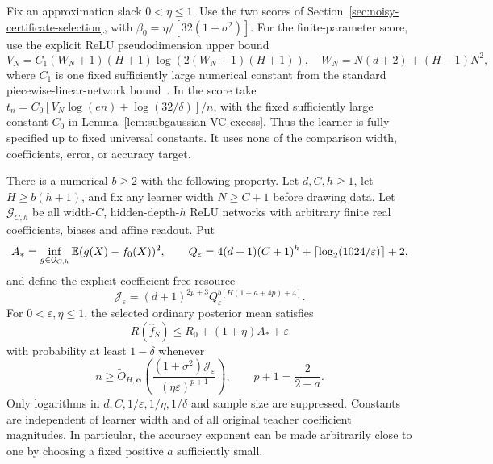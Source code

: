 Fix an approximation slack $0<\eta\le1$. Use the two scores of Section~\ref{sec:noisy-certificate-selection}, with
$\beta_0=\eta/[32(1+\sigma^2)]$. For the finite-parameter score, use the explicit ReLU pseudodimension upper bound
\[
 V_N=C_1(W_N+1)(H+1)\log(2(W_N+1)(H+1)),
 \quad W_N=N(d+2)+(H-1)N^2,
\]
where $C_1$ is one fixed sufficiently large numerical constant from the standard piecewise-linear-network bound~\cite{relu-vc}. In the score take
$t_n=C_0[V_N\log(en)+\log(32/\delta)]/n$, with the fixed sufficiently large constant $C_0$ in Lemma~\ref{lem:subgaussian-VC-excess}. Thus the learner is fully specified up to fixed universal constants. It uses none of the comparison width, coefficients, error, or accuracy target.

\begin{theorem}
\label{thm:layerwise-Boolean-width}
There is a numerical $b\ge2$ with the following property. Let $d,C,h\ge1$, let $H\ge b(h+1)$, and fix any learner width $N\ge C+1$ before drawing data. Let $\mathcal G_{C,h}$ be all width-$C$, hidden-depth-$h$ ReLU networks with arbitrary finite real coefficients, biases and affine readout. Put
\[
 A_* =\inf_{g\in\mathcal G_{C,h}}\mathbb E(g(X)-f_0(X))^2,
 \qquad
 Q_\varepsilon=4(d+1)(C+1)^h+
                 \lceil\log_2(1024/\varepsilon)\rceil+2,
\]
and define the explicit coefficient-free resource
\[
 \mathcal J_\varepsilon
 =(d+1)^{2p+3}
   Q_\varepsilon^{b[H(1+a+4p)+4]}.
\]
For $0<\varepsilon,\eta\le1$, the selected ordinary posterior mean satisfies
\begin{equation}
 R(\widehat f_S)\le R_0+(1+\eta)A_*+\varepsilon
 \label{eq:layerwise-Boolean-conclusion}
\end{equation}
with probability at least $1-\delta$ whenever
\begin{equation}
 n\ge\widetilde O_{H,\boldsymbol\alpha}\left(
 \frac{(1+\sigma^2)\mathcal J_\varepsilon}
      {(\eta\varepsilon)^{p+1}}\right),
 \qquad p+1=\frac2{2-a}.
 \label{eq:layerwise-Boolean-samples}
\end{equation}
Only logarithms in $d,C,1/\varepsilon,1/\eta,1/\delta$ and sample size are suppressed. Constants are independent of learner width and of all original teacher coefficient magnitudes. In particular, the accuracy exponent can be made arbitrarily close to one by choosing a fixed positive $a$ sufficiently small.
\end{theorem}
